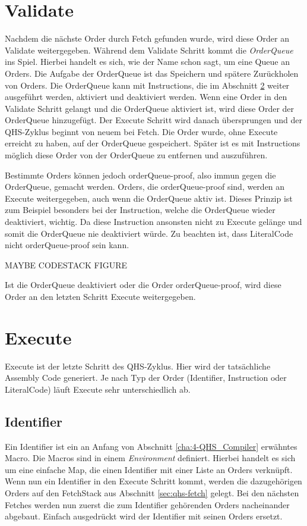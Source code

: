 \section{Validate} \label{sec:qhs-Validate}
Nachdem die nächste Order durch Fetch gefunden wurde, wird diese Order an Validate weitergegeben. Während dem Validate Schritt kommt die \textit{OrderQueue} ins Spiel. Hierbei handelt es sich, wie der Name schon sagt, um eine Queue an Orders.
Die Aufgabe der OrderQueue ist das Speichern und spätere Zurückholen von Orders. Die OrderQueue kann mit Instructions, die im Abschnitt \ref{sec:qhs-execute} weiter ausgeführt werden, aktiviert und deaktiviert werden.
Wenn eine Order in den Validate Schritt gelangt und die OrderQueue aktiviert ist, wird diese Order der OrderQueue hinzugefügt. Der Execute Schritt wird danach übersprungen und der QHS-Zyklus beginnt von neuem bei Fetch.
Die Order wurde, ohne Execute erreicht zu haben, auf der OrderQueue gespeichert. Später ist es mit Instructions möglich diese Order von der OrderQueue zu entfernen und auszuführen.

Bestimmte Orders können jedoch orderQueue-proof, also immun gegen die OrderQueue, gemacht werden. Orders, die orderQueue-proof sind, werden an Execute weitergegeben, auch wenn die OrderQueue aktiv ist.
Dieses Prinzip ist zum Beispiel besonders bei der Instruction, welche die OrderQueue wieder deaktiviert, wichtig. Da diese Instruction ansonsten nicht zu Execute gelänge und somit die OrderQueue nie deaktiviert würde.
Zu beachten ist, dass LiteralCode nicht orderQueue-proof sein kann.

MAYBE CODESTACK FIGURE

Ist die OrderQueue deaktiviert oder die Order orderQueue-proof, wird diese Order an den letzten Schritt Execute weitergegeben.

\section{Execute} \label{sec:qhs-execute}
Execute ist der letzte Schritt des QHS-Zyklus. Hier wird der tatsächliche Assembly Code generiert. Je nach Typ der Order (Identifier, Instruction oder LiteralCode) läuft Execute sehr unterschiedlich ab.

\subsection{Identifier}
Ein Identifier ist ein an Anfang von Abschnitt \ref{cha:4-QHS_Compiler} erwähntes Macro. Die Macros sind in einem \textit{Environment} definiert.
Hierbei handelt es sich um eine einfache Map, die einen Identifier mit einer Liste an Orders verknüpft.
Wenn nun ein Identifier in den Execute Schritt kommt, werden die dazugehörigen Orders auf den FetchStack aus Abschnitt \ref{sec:qhs-fetch} gelegt.
Bei den nächsten Fetches werden nun zuerst die zum Identifier gehörenden Orders nacheinander abgebaut. Einfach ausgedrückt wird der Identifier mit seinen Orders ersetzt.

